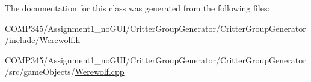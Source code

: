 The documentation for this class was generated from the following files\+:\begin{DoxyCompactItemize}
\item 
C\+O\+M\+P345/\+Assignment1\+\_\+no\+G\+U\+I/\+Critter\+Group\+Generator/\+Critter\+Group\+Generator/include/\hyperlink{_werewolf_8h}{Werewolf.\+h}\item 
C\+O\+M\+P345/\+Assignment1\+\_\+no\+G\+U\+I/\+Critter\+Group\+Generator/\+Critter\+Group\+Generator/src/game\+Objects/\hyperlink{_werewolf_8cpp}{Werewolf.\+cpp}\end{DoxyCompactItemize}
